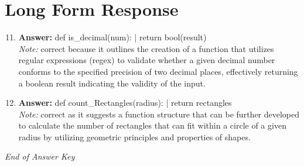 \documentclass[12pt]{article}
\begin{document}
\section*{Long Form Response}
\begin{enumerate}[label=\arabic*.]
\setcounter{enumi}{10}
\item \textbf{Answer:} def is\_decimal(num): | return bool(result)
\\ \textit{Note:} correct because it outlines the creation of a function that utilizes regular expressions (regex) to validate whether a given decimal number conforms to the specified precision of two decimal places, effectively returning a boolean result indicating the validity of the input.
\item \textbf{Answer:} def count\_Rectangles(radius): | return rectangles
\\ \textit{Note:} correct as it suggests a function structure that can be further developed to calculate the number of rectangles that can fit within a circle of a given radius by utilizing geometric principles and properties of shapes.
\end{enumerate}

\vfill
\noindent\textit{End of Answer Key}
\end{document}
